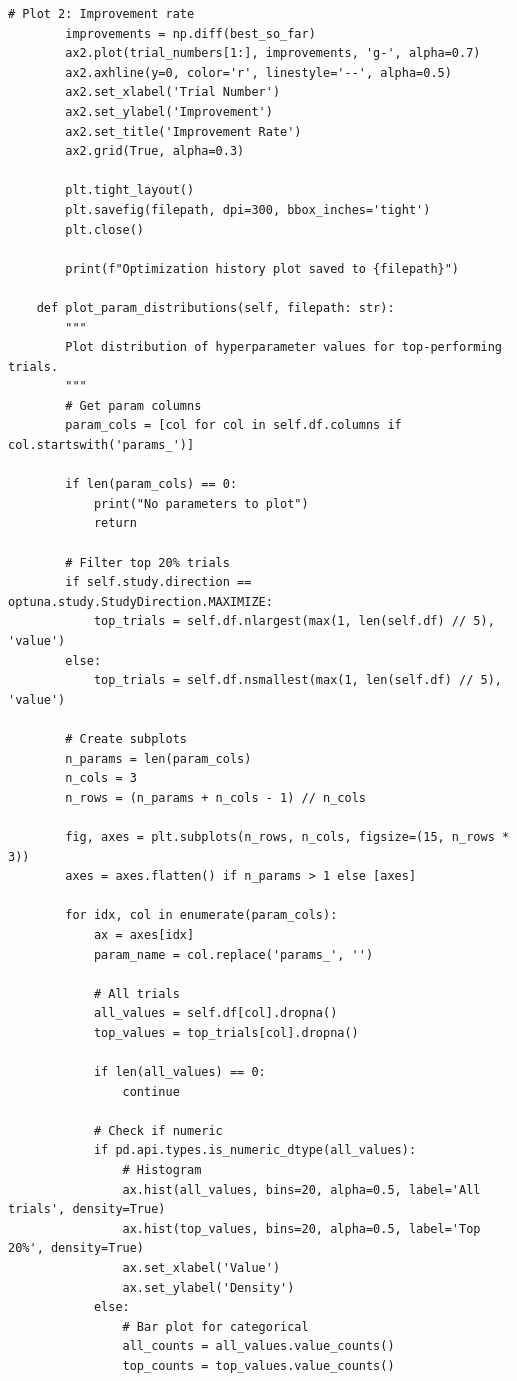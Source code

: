 \begin{lstlisting}[style=python, caption=Comprehensive HPO analysis and visualization]
        # Plot 2: Improvement rate
        improvements = np.diff(best_so_far)
        ax2.plot(trial_numbers[1:], improvements, 'g-', alpha=0.7)
        ax2.axhline(y=0, color='r', linestyle='--', alpha=0.5)
        ax2.set_xlabel('Trial Number')
        ax2.set_ylabel('Improvement')
        ax2.set_title('Improvement Rate')
        ax2.grid(True, alpha=0.3)

        plt.tight_layout()
        plt.savefig(filepath, dpi=300, bbox_inches='tight')
        plt.close()

        print(f"Optimization history plot saved to {filepath}")

    def plot_param_distributions(self, filepath: str):
        """
        Plot distribution of hyperparameter values for top-performing trials.
        """
        # Get param columns
        param_cols = [col for col in self.df.columns if col.startswith('params_')]

        if len(param_cols) == 0:
            print("No parameters to plot")
            return

        # Filter top 20% trials
        if self.study.direction == optuna.study.StudyDirection.MAXIMIZE:
            top_trials = self.df.nlargest(max(1, len(self.df) // 5), 'value')
        else:
            top_trials = self.df.nsmallest(max(1, len(self.df) // 5), 'value')

        # Create subplots
        n_params = len(param_cols)
        n_cols = 3
        n_rows = (n_params + n_cols - 1) // n_cols

        fig, axes = plt.subplots(n_rows, n_cols, figsize=(15, n_rows * 3))
        axes = axes.flatten() if n_params > 1 else [axes]

        for idx, col in enumerate(param_cols):
            ax = axes[idx]
            param_name = col.replace('params_', '')

            # All trials
            all_values = self.df[col].dropna()
            top_values = top_trials[col].dropna()

            if len(all_values) == 0:
                continue

            # Check if numeric
            if pd.api.types.is_numeric_dtype(all_values):
                # Histogram
                ax.hist(all_values, bins=20, alpha=0.5, label='All trials', density=True)
                ax.hist(top_values, bins=20, alpha=0.5, label='Top 20%', density=True)
                ax.set_xlabel('Value')
                ax.set_ylabel('Density')
            else:
                # Bar plot for categorical
                all_counts = all_values.value_counts()
                top_counts = top_values.value_counts()


\end{lstlisting}
